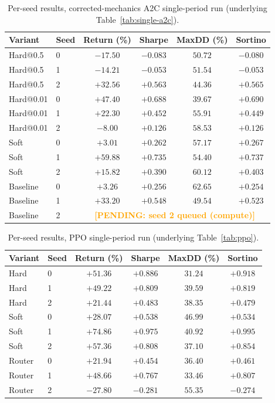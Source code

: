 \documentclass[sigconf,anonymous,review]{acmart}
\newcommand{\pending}[1]{\textcolor{orange}{\textbf{[PENDING: #1]}}}
\begin{document}
\begin{table}[h]
\caption{Per-seed results, corrected-mechanics A2C single-period run
(underlying Table~\ref{tab:single-a2c}).}
\label{tab:perseed-a2c}
\begin{tabular}{llcccc}
\toprule
Variant & Seed & Return (\%) & Sharpe & MaxDD (\%) & Sortino \\
\midrule
Hard@0.5  & 0 & $-17.50$ & $-0.083$ & $50.72$ & $-0.080$ \\
Hard@0.5  & 1 & $-14.21$ & $-0.053$ & $51.54$ & $-0.053$ \\
Hard@0.5  & 2 & $+32.56$ & $+0.563$ & $44.36$ & $+0.565$ \\
Hard@0.01 & 0 & $+47.40$ & $+0.688$ & $39.67$ & $+0.690$ \\
Hard@0.01 & 1 & $+22.30$ & $+0.452$ & $55.91$ & $+0.449$ \\
Hard@0.01 & 2 & $-8.00$  & $+0.126$ & $58.53$ & $+0.126$ \\
Soft      & 0 & $+3.01$  & $+0.262$ & $57.17$ & $+0.267$ \\
Soft      & 1 & $+59.88$ & $+0.735$ & $54.40$ & $+0.737$ \\
Soft      & 2 & $+15.82$ & $+0.390$ & $60.12$ & $+0.403$ \\
Baseline  & 0 & $+3.26$  & $+0.256$ & $62.65$ & $+0.254$ \\
Baseline  & 1 & $+33.20$ & $+0.548$ & $49.54$ & $+0.523$ \\
Baseline  & 2 & \multicolumn{4}{c}{\pending{seed 2 queued (compute)}} \\
\bottomrule
\end{tabular}
\end{table}

\begin{table}[h]
\caption{Per-seed results, PPO single-period run (underlying
Table~\ref{tab:ppo}).}
\label{tab:perseed-ppo}
\begin{tabular}{llcccc}
\toprule
Variant & Seed & Return (\%) & Sharpe & MaxDD (\%) & Sortino \\
\midrule
Hard   & 0 & $+51.36$ & $+0.886$ & $31.24$ & $+0.918$ \\
Hard   & 1 & $+49.22$ & $+0.809$ & $39.59$ & $+0.819$ \\
Hard   & 2 & $+21.44$ & $+0.483$ & $38.35$ & $+0.479$ \\
Soft   & 0 & $+28.07$ & $+0.538$ & $46.99$ & $+0.534$ \\
Soft   & 1 & $+74.86$ & $+0.975$ & $40.92$ & $+0.995$ \\
Soft   & 2 & $+57.36$ & $+0.808$ & $37.10$ & $+0.854$ \\
Router & 0 & $+21.94$ & $+0.454$ & $36.40$ & $+0.461$ \\
Router & 1 & $+48.66$ & $+0.767$ & $33.46$ & $+0.807$ \\
Router & 2 & $-27.80$ & $-0.281$ & $55.35$ & $-0.274$ \\
\bottomrule
\end{tabular}
\end{table}
\end{document}
